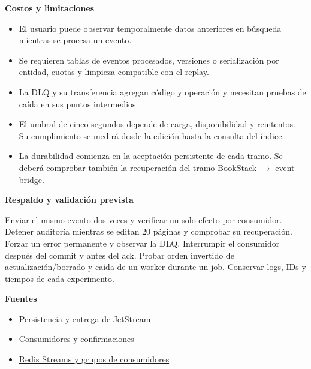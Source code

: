 \par\medskip\noindent\textbf{Costos y limitaciones}\par\nobreak\smallskip

\begin{itemize}[leftmargin=1.5em,itemsep=3pt]
\item El usuario puede observar temporalmente datos anteriores en búsqueda mientras se procesa un evento.
\item Se requieren tablas de eventos procesados, versiones o serialización por entidad, cuotas y limpieza compatible con el replay.
\item La DLQ y su transferencia agregan código y operación y necesitan pruebas de caída en sus puntos intermedios.
\item El umbral de cinco segundos depende de carga, disponibilidad y reintentos. Su cumplimiento se medirá desde la edición hasta la consulta del índice.
\item La durabilidad comienza en la aceptación persistente de cada tramo. Se deberá comprobar también la recuperación del tramo BookStack \ensuremath{\rightarrow} event-bridge.
\end{itemize}

\par\medskip\noindent\textbf{Respaldo y validación prevista}\par\nobreak\smallskip

Enviar el mismo evento dos veces y verificar un solo efecto por consumidor. Detener auditoría mientras se editan 20 páginas y comprobar su recuperación. Forzar un error permanente y observar la DLQ. Interrumpir el consumidor después del commit y antes del ack. Probar orden invertido de actualización/borrado y caída de un worker durante un job. Conservar logs, IDs y tiempos de cada experimento.

\par\medskip\noindent\textbf{Fuentes}\par\nobreak\smallskip

\begin{itemize}[leftmargin=1.5em,itemsep=3pt]
\item \href{https://docs.nats.io/concepts/jetstream}{Persistencia y entrega de JetStream}
\item \href{https://docs.nats.io/learn/jetstream/pull-consumers}{Consumidores y confirmaciones}
\item \href{https://redis.io/docs/latest/develop/data-types/streams/}{Redis Streams y grupos de consumidores}
\end{itemize}

